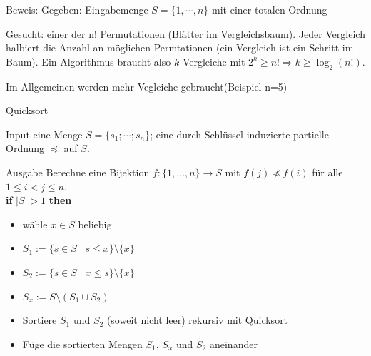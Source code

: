 \documentclass{beamer}
\begin{document}
\begin{frame}
\begin{block}{Beweis:}
Gegeben: Eingabemenge $S=\{1,\cdots,n\}$ mit einer totalen Ordnung

Gesucht: einer der n! Permutationen (Blätter im Vergleichsbaum). 
Jeder Vergleich halbiert die Anzahl an möglichen Permtationen (ein Vergleich ist ein Schritt im Baum).
Ein Algorithmus braucht also $k$ Vergleiche mit $2^k\ge n! $$\Rightarrow k\ge \log_2(n!)$.

Im Allgemeinen werden mehr Vegleiche gebraucht(Beispiel n=5)
\end{block} 
\end{frame}
\begin{frame}{Quicksort}
\begin{block}{Input}
eine  Menge $S=\{s_1; \cdots ;s_n \}$; eine durch Schlüssel induzierte partielle Ordnung $\preceq $ auf $S$.
\end{block}
\begin{block}{Ausgabe}
Berechne eine Bijektion $f \colon \{1,\dots,n\} \to S$ mit $f(j) \not\preceq f(i)$ für alle $1\le i<j \le n$.\\
\textbf{if} $|S| > 1$ \textbf{then} \\\begin{itemize} \item wähle $x\in S$ beliebig
     \item $S_1 := \{s \in S \mid s \leq x\} \setminus \{x\}$
    \item$S_2 := \{s \in S \mid x \leq s\} \setminus \{x\}$
   \item $S_x := S \setminus (S_1 \cup S_2)$
    \item Sortiere $S_1$ und $S_2$ (soweit nicht leer) rekursiv mit Quicksort
    \item  Füge die sortierten Mengen $S_1$, $S_x$ und $S_2$ aneinander
    \end{itemize}
\end{block}


\end{frame}
\end{document}
